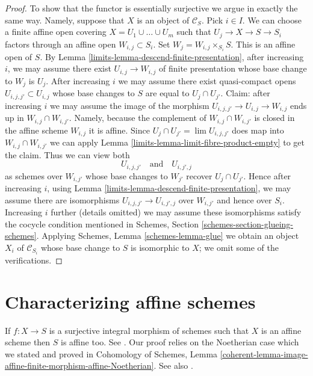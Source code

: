 \begin{proof}
\medskip\noindent
To show that the functor is essentially surjective we argue in
exactly the same way. Namely, suppose that
$X$ is an object of $\mathcal{C}_S$. Pick $i \in I$.
We can choose a finite affine open covering
$X = U_1 \cup \ldots \cup U_m$ such that $U_j \to X \to S \to S_i$
factors through an affine open $W_{i, j} \subset S_i$.
Set $W_j = W_{i, j} \times_{S_i} S$. This is an affine open of $S$.
By Lemma \ref{limits-lemma-descend-finite-presentation},
after increasing $i$, we may assume there exist
$U_{i, j} \to W_{i, j}$ of finite presentation
whose base change to $W_j$ is $U_j$.
After increasing $i$ we may assume there exist
quasi-compact opens $U_{i, j, j'} \subset U_{i, j}$
whose base changes to $S$ are equal to $U_j \cap U_{j'}$.
Claim: after increasing $i$ we may assume the image of the morphism
$U_{i, j, j'} \to U_{i, j} \to W_{i, j}$
ends up in $W_{i, j} \cap W_{i, j'}$.
Namely, because the complement of $W_{i, j} \cap W_{i, j'}$
is closed in the affine scheme $W_{i, j}$ it is affine.
Since $U_j \cap U_{j'} = \lim U_{i, j, j'}$ does map into
$W_{i, j} \cap W_{i, j'}$
we can apply Lemma \ref{limits-lemma-limit-fibre-product-empty}
to get the claim. Thus we can view both
$$
U_{i, j, j'} \quad\text{and}\quad U_{i, j', j}
$$
as schemes over $W_{i, j'}$ whose base changes to $W_{j'}$
recover $U_j \cap U_{j'}$. Hence after increasing $i$, using
Lemma \ref{limits-lemma-descend-finite-presentation},
we may assume there are isomorphisms
$U_{i, j, j'} \to U_{i, j', j}$ over $W_{i, j'}$ and hence
over $S_i$. Increasing $i$ further (details omitted)
we may assume these isomorphisms
satisfy the cocycle condition mentioned in
Schemes, Section \ref{schemes-section-glueing-schemes}.
Applying Schemes, Lemma \ref{schemes-lemma-glue}
we obtain an object $X_i$ of $\mathcal{C}_{S_i}$ whose
base change to $S$ is isomorphic to $X$; we omit some
of the verifications.
\end{proof}

\section{Characterizing affine schemes}
\label{limits-section-affine}
If $f : X \to S$ is a surjective integral morphism of schemes
such that $X$ is an affine scheme then $S$ is affine too.
See \cite[A.2]{Conrad-Nagata}. Our proof relies
on the Noetherian case which we stated and proved in Cohomology of Schemes,
Lemma \ref{coherent-lemma-image-affine-finite-morphism-affine-Noetherian}.
See also \cite[II 6.7.1]{EGA}.

